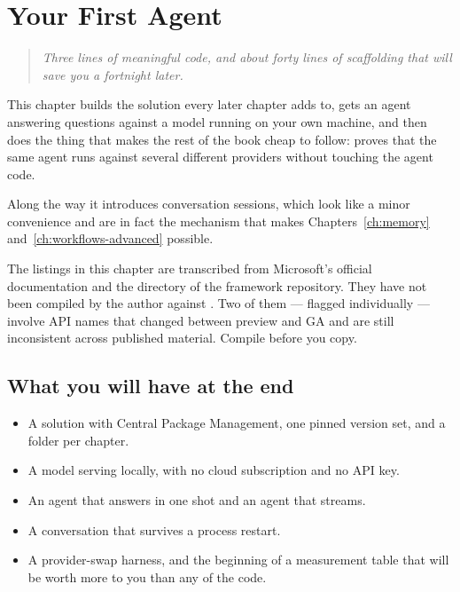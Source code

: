 \chapter{Your First Agent}
\label{ch:first-agent}

\begin{quote}
\itshape
Three lines of meaningful code, and about forty lines of scaffolding that will
save you a fortnight later.
\end{quote}

\noindent
This chapter builds the solution every later chapter adds to, gets an agent
answering questions against a model running on your own machine, and then does
the thing that makes the rest of the book cheap to follow: proves that the same
agent runs against several different providers without touching the agent code.

Along the way it introduces conversation sessions, which look like a minor
convenience and are in fact the mechanism that makes Chapters~\ref{ch:memory}
and~\ref{ch:workflows-advanced} possible.

\begin{verifybox}
The listings in this chapter are transcribed from Microsoft's official
documentation and the  directory of the
framework repository. They have not been compiled by the author against
\mafcore{}. Two of them --- flagged individually --- involve API names that
changed between preview and GA and are still inconsistent across published
material. Compile before you copy.
\end{verifybox}

\section{What you will have at the end}

\begin{itemize}[leftmargin=1.4em]
\item A solution with Central Package Management, one pinned version set, and a
      folder per chapter.
\item A model serving locally, with no cloud subscription and no API key.
\item An agent that answers in one shot and an agent that streams.
\item A conversation that survives a process restart.
\item A provider-swap harness, and the beginning of a measurement table that
      will be worth more to you than any of the code.
\end{itemize}

